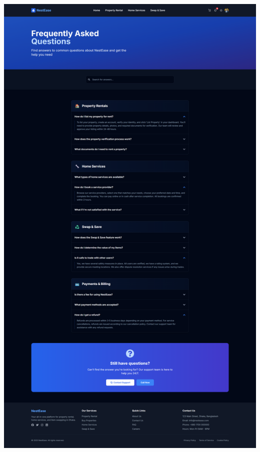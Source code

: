 \documentclass[conference]{IEEEtran}
\begin{document}
\begin{center}
\begin{minipage}[t]{0.45\textwidth}
\includegraphics[width=\linewidth]{Project Screenshot/FAQs.png}
\end{minipage}


\end{center}
\end{document}
